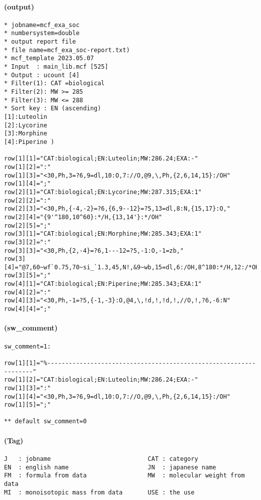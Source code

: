 \documentclass[a4paper]{article}
\begin{document}
\paragraph{(output)}
\begin{verbatim}
* jobname=mcf_exa_soc
* numbersystem=double
* output report file
* file name=mcf_exa_soc-report.txt)
* mcf_template 2023.05.07
* Input  : main_lib.mcf [525]
* Output : ucount [4]
* Filter(1): CAT =biological
* Filter(2): MW >= 285
* Filter(3): MW <= 288
* Sort key : EN (ascending)
[1]:Luteolin
[2]:Lycorine
[3]:Morphine
[4]:Piperine )

row[1][1]="CAT:biological;EN:Luteolin;MW:286.24;EXA:-"
row[1][2]=":"
row[1][3]="<30,Ph,3=?6,9=dl,10:O,7://O,@9,\,Ph,{2,6,14,15}:/OH"
row[1][4]=";"
row[2][1]="CAT:biological;EN:Lycorine;MW:287.315;EXA:1"
row[2][2]=":"
row[2][3]="<30,Ph,{-4,-2}=?6,{6,9--12}=?5,13=dl,8:N,{15,17}:O,"
row[2][4]="{9'^180,10^60}:*/H,{13,14'}:*/OH"
row[2][5]=";"
row[3][1]="CAT:biological;EN:Morphine;MW:285.343;EXA:1"
row[3][2]=":"
row[3][3]="<30,Ph,{2,-4}=?6,1---12=?5,-1:O,-1=zb,"
row[3][4]="@7,60~wf`0.75,70~si_`1.3,45,N!,&9~wb,15=dl,6:/OH,8^180:*/H,12:/*OH"
row[3][5]=";"
row[4][1]="CAT:biological;EN:Piperine;MW:285.343;EXA:1"
row[4][2]=":"
row[4][3]="<30,Ph,-1=?5,{-1,-3}:O,@4,\,!d,!,!d,!,//O,!,?6,-6:N"
row[4][4]=";"
\end{verbatim}
\paragraph{(sw\_comment)}
\begin{verbatim}
sw_comment=1:

row[1][1]="%------------------------------------------------------------------"
row[1][2]="CAT:biological;EN:Luteolin;MW:286.24;EXA:-"
row[1][3]=":"
row[1][4]="<30,Ph,3=?6,9=dl,10:O,7://O,@9,\,Ph,{2,6,14,15}:/OH"
row[1][5]=";"

** default sw_comment=0
\end{verbatim}
\paragraph{(Tag)}
\begin{verbatim}
J   : jobname                           CAT : category
EN  : english name                      JN  : japanese name
FM  : formula from data                 MW  : molecular weight from data
MI  : monoisotopic mass from data       USE : the use
\end{verbatim}
\newpage
\noindent%
\newpage
\end{document}

